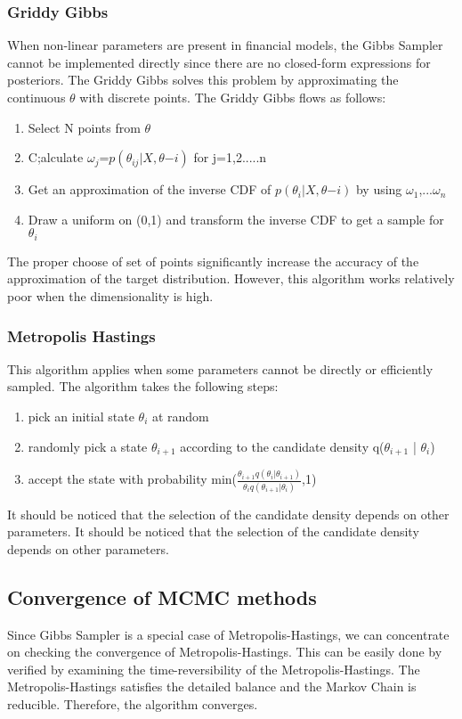 \documentclass[letterpaper]{article}
\begin{document}
	\subsubsection{Griddy Gibbs}
	When non-linear parameters are present in financial models, the Gibbs Sampler cannot be implemented directly since there are no closed-form expressions for posteriors. The Griddy Gibbs solves this problem by approximating the continuous $\theta$ with discrete points. The Griddy Gibbs flows as follows:
	\begin{enumerate}
		\item Select N points from $\theta$
		\item C;alculate $\omega_{j}$=$p(\theta_{ij}|X,\theta{-i})$ for j=1,2.....n
		\item Get an approximation of the inverse CDF of $p(\theta_{i}|X,\theta{-i})$ by using $\omega_{1}$,...$\omega_{n}$
		\item Draw a uniform on (0,1) and transform the inverse CDF to get a sample for $\theta_{i}$
	\end{enumerate}
	The proper choose of set of points significantly increase the accuracy of the approximation of the target distribution. However, this algorithm works relatively poor when the dimensionality is high. 
	
	\subsubsection{Metropolis Hastings}
	This algorithm applies when some parameters cannot be directly or efficiently sampled. The algorithm takes the following steps:
	\begin{enumerate}
		\item pick an initial state $\theta_{i}$ at random
		\item randomly pick a state $\theta_{i+1}$ according to the candidate density q($\theta_{i+1}$ | $\theta_{i}$)
		\item accept the state with probability min($\frac{\theta_{i+1}q(\theta_{i}|\theta_{i+1})}{\theta_{i}q(\theta_{i+1}|\theta_{i})}$,1)
	\end{enumerate}
	It should be noticed that the selection of the candidate density depends on other parameters. It should be noticed that the selection of the candidate density depends on other parameters. 
	\subsection{Convergence of MCMC methods}
	Since Gibbs Sampler is a special case of Metropolis-Hastings, we can concentrate on checking the convergence of Metropolis-Hastings. This can be easily done by verified by examining the time-reversibility of the Metropolis-Hastings. The Metropolis-Hastings satisfies the detailed balance and the Markov Chain is reducible. Therefore, the algorithm converges. 
	\newpage
	
\end{document}

